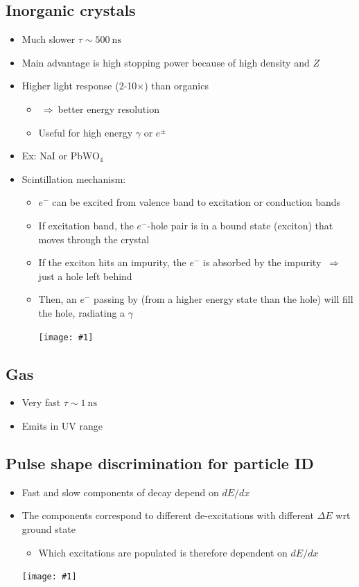 \documentclass[11pt]{article}
\newcommand{\ns}{\text{ns}}
\newcommand{\el}{\ensuremath{e^{-}}\xspace}
\newcommand{\thus}{$~\Rightarrow~$}
\newcommand{\embedimgw}[2]{\begin{center}\texttt{[image: \#1]}\end{center}}
\begin{document}
\subsection{Inorganic crystals}
\begin{itemize}
  \item Much slower $\tau\sim 500~\ns$
  \item Main advantage is high stopping power because of high density and $Z$
  \item Higher light response (2-10$\times$) than organics
  \begin{itemize}
    \item \thus better energy resolution
    \item Useful for high energy $\gamma$ or $e^\pm$
  \end{itemize}
  \item Ex: NaI or PbWO$_4$
  \item Scintillation mechanism:
  \begin{itemize}
    \item \el can be excited from valence band to excitation or conduction bands
    \item If excitation band, the \el-hole pair is in a bound state (exciton) that moves through the crystal
    \item If the exciton hits an impurity, the \el is absorbed by the impurity \thus just a hole left behind
    \item Then, an \el passing by (from a higher energy state than the hole) will fill the hole, radiating a $\gamma$ 
    \embedimgw{figs/scint_inorganic.png}{.6}
  \end{itemize}
\end{itemize}

\subsection{Gas}
\begin{itemize}
  \item Very fast $\tau\sim 1~\ns$
  \item Emits in UV range
\end{itemize}

\subsection{Pulse shape discrimination for particle ID}
\begin{itemize}
  \item Fast and slow components of decay depend on $dE/dx$
  \item The components correspond to different de-excitations with different $\Delta E$ wrt ground state
  \begin{itemize}
    \item Which excitations are populated is therefore dependent on $dE/dx$
  \end{itemize}
  \embedimgw{figs/scint_psd.png}{.6}
\end{itemize}
\end{document}
